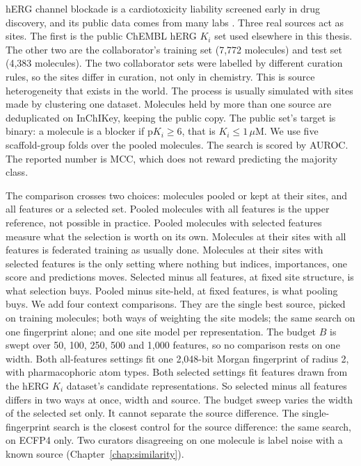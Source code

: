 hERG channel blockade is a cardiotoxicity liability screened early in drug discovery, and its public data comes from many labs \citep{Czodrowski2013}. Three real sources act as sites. The first is the public ChEMBL hERG $K_i$ set used elsewhere in this thesis. The other two are the collaborator's training set (7,772 molecules) and test set (4,383 molecules). The two collaborator sets were labelled by different curation rules, so the sites differ in curation, not only in chemistry. This is source heterogeneity that exists in the world. The process is usually simulated with sites made by clustering one dataset. Molecules held by more than one source are deduplicated on InChIKey, keeping the public copy. The public set's target is binary: a molecule is a blocker if $\mathrm{p}K_i \ge 6$, that is $K_i \le 1\,\mu\mathrm{M}$. We use five scaffold-group folds over the pooled molecules. The search is scored by AUROC. The reported number is MCC, which does not reward predicting the majority class.

The comparison crosses two choices: molecules pooled or kept at their sites, and all features or a selected set. Pooled molecules with all features is the upper reference, not possible in practice. Pooled molecules with selected features measure what the selection is worth on its own. Molecules at their sites with all features is federated training as usually done. Molecules at their sites with selected features is the only setting where nothing but indices, importances, one score and predictions moves. Selected minus all features, at fixed site structure, is what selection buys. Pooled minus site-held, at fixed features, is what pooling buys. We add four context comparisons. They are the single best source, picked on training molecules; both ways of weighting the site models; the same search on one fingerprint alone; and one site model per representation. The budget $B$ is swept over 50, 100, 250, 500 and 1,000 features, so no comparison rests on one width. Both all-features settings fit one 2,048-bit Morgan fingerprint of radius 2, with pharmacophoric atom types. Both selected settings fit features drawn from the hERG $K_i$ dataset's candidate representations. So selected minus all features differs in two ways at once, width and source. The budget sweep varies the width of the selected set only. It cannot separate the source difference. The single-fingerprint search is the closest control for the source difference: the same search, on ECFP4 only. Two curators disagreeing on one molecule is label noise with a known source (Chapter~\ref{chap:similarity}).

